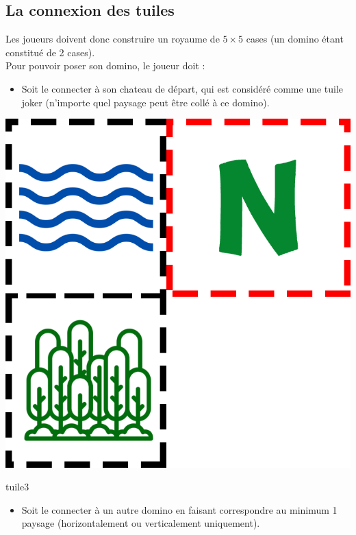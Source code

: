 \newpage
\subsection{La connexion des tuiles}

Les joueurs doivent donc construire un royaume de $5 \times 5$ cases (un domino étant constitué de 2 cases).\\
Pour pouvoir poser son domino, le joueur doit :
\begin{itemize}
    \item Soit le connecter à son chateau de départ, qui est considéré comme une tuile joker (n'importe quel paysage peut être collé à ce domino).
\end{itemize}
\begin{center}
  \includegraphics[scale=0.5]{Figures/tuilechateau.png}
  \caption{tuile3}
\end{center}
\begin{itemize}
    \item Soit le connecter à un autre domino en faisant correspondre au minimum 1 paysage (horizontalement ou verticalement uniquement).
\end{itemize}
